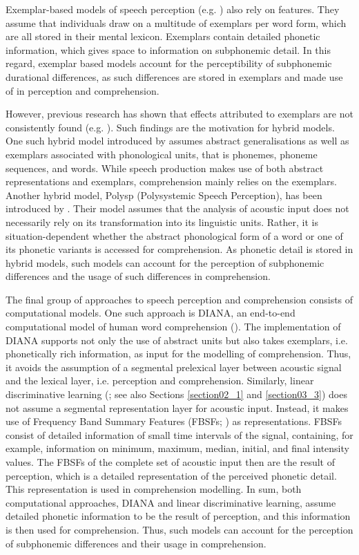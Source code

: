 Exemplar-based models of speech perception (e.g. \cite{Goldinger1996}) also rely on features. They assume that individuals draw on a multitude of exemplars per word form, which are all stored in their mental lexicon. Exemplars contain detailed phonetic information, which gives space to information on subphonemic detail. In this regard, exemplar based models account for the perceptibility of subphonemic durational differences, as such differences are stored in exemplars and made use of in perception and comprehension. 

However, previous research has shown that effects attributed to exemplars are not consistently found (e.g. \cite{Hanique2013Aalders}). Such findings are the motivation for hybrid models. One such hybrid model introduced by \citet{Pierrehumbert2002} assumes abstract generalisations as well as exemplars associated with phonological units, that is phonemes, phoneme sequences, and words. While speech production makes use of both abstract representations and exemplars, comprehension mainly relies on the exemplars. Another hybrid model, Polysp (Polysystemic Speech Perception), has been introduced by \citet{Hawkins2001}. Their model assumes that the analysis of acoustic input does not necessarily rely on its transformation into its linguistic units. Rather, it is situation-dependent whether the abstract phonological form of a word or one of its phonetic variants is accessed for comprehension. As phonetic detail is stored in hybrid models, such models can account for the perception of subphonemic differences and the usage of such differences in comprehension.

The final group of approaches to speech perception and comprehension consists of computational models. One such approach is DIANA, an end-to-end computational model of human word comprehension (\cite{tenBosch2015, tenBosch2021}). The implementation of DIANA supports not only the use of abstract units but also takes exemplars, i.e. phonetically rich information, as input for the modelling of comprehension. Thus, it avoids the assumption of a segmental prelexical layer between acoustic signal and the lexical layer, i.e. perception and comprehension. Similarly, linear discriminative learning (\cite{Baayen2019}; see also Sections \ref{section02_1} and \ref{section03_3}) does not assume a segmental representation layer for acoustic input. Instead, it makes use of Frequency Band Summary Features (FBSFs; \cite{Arnold2017}) as representations. FBSFs consist of detailed information of small time intervals of the signal, containing, for example, information on minimum, maximum, median, initial, and final intensity values. The FBSFs of the complete set of acoustic input then are the result of perception, which is a detailed representation of the perceived phonetic detail. This representation is used in comprehension modelling. In sum, both computational approaches, DIANA and linear discriminative learning, assume detailed phonetic information to be the result of perception, and this information is then used for comprehension. Thus, such models can account for the perception of subphonemic differences and their usage in comprehension. 

